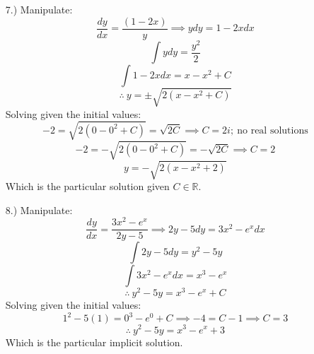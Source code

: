 \documentclass[12pt]{article}
\begin{document}
\begin{itemize}
    \pagebreak
    \item [7.)] Manipulate:
    \begin{equation*}
        \dfrac{dy}{dx}=\frac{(1-2x)}{y}\implies ydy=1-2xdx
    \end{equation*}
    \begin{equation*}
        \int ydy=\frac{y^2}{2}
    \end{equation*}
    \begin{equation*}
        \int 1-2xdx=x-x^2+C
    \end{equation*}
    \begin{equation*}
        \therefore\ y=\pm\sqrt{2(x-x^2+C)}
    \end{equation*}
    Solving given the initial values:
    \begin{equation*}
    -2=\sqrt{2(0-0^2+C)}=\sqrt{2C}\implies C=2i;\ \text{no real solutions}
    \end{equation*}
    \begin{equation*}
        -2=-\sqrt{2(0-0^2+C)}=-\sqrt{2C}\implies C=2
    \end{equation*}
    \begin{equation*}
        y=-\sqrt{2(x-x^2+2)}
    \end{equation*}
    Which is the particular solution given $C\in\mathbb{R}$.

    \item [8.)] Manipulate:
    \begin{equation*}
        \dfrac{dy}{dx}=\frac{3x^2-e^x}{2y-5}\implies2y-5dy=3x^2-e^xdx
    \end{equation*}
    \begin{equation*}
        \int2y-5dy=y^2-5y
    \end{equation*}
    \begin{equation*}
        \int3x^2-e^xdx=x^3-e^x
    \end{equation*}
    \begin{equation*}
        \therefore\ y^2-5y=x^3-e^x+C
    \end{equation*}
    Solving given the initial values:
    \begin{equation*}
        1^2-5(1)=0^3-e^0+C\implies-4=C-1\implies C=3
    \end{equation*}
    \begin{equation*}
        \therefore\ y^2-5y=x^3-e^x+3
    \end{equation*}
    Which is the particular implicit solution.

\end{itemize}
\end{document}
